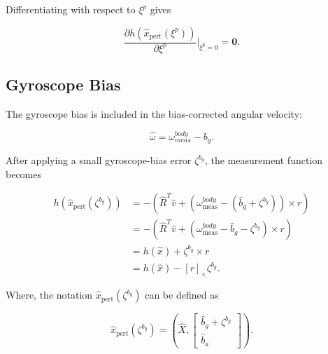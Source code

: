 \documentclass[report.tex]{subfiles}
\begin{document}
    Differentiating with respect to $\xi^p$ gives

    \begin{equation}
        \frac{\partial h(\hat x_{\mathrm{pert}}(\xi^p))}
        {\partial \xi^p}\bigg|_{\xi^p=0}
        =
        \mathbf{0}.
    \end{equation}

    \subsection{Gyroscope Bias}

    The gyroscope bias is included in the bias-corrected angular velocity:

    \begin{equation}
        \hat \omega
        =
        \omega_{meas}^{body}-b_g.
    \end{equation}

    After applying a small gyroscope-bias error $\zeta^{b_g}$, the measurement function becomes

\begin{align}
    h\left(\hat x_{\mathrm{pert}}(\zeta^{b_g})\right)
    &=
    -\left(
        \hat{R}^{T}\hat{v}
        +
        \left(
            \omega_{\mathrm{meas}}^{body}
            -
            \left(
                \hat{b}_g+\zeta^{b_g}
            \right)
        \right)
        \times r
    \right)
    \\
    &=
    -\left(
        \hat{R}^{T}\hat{v}
        +
        \left(
            \omega_{\mathrm{meas}}^{body}
            -
            \hat{b}_g
            -
            \zeta^{b_g}
        \right)
        \times r
    \right)
    \\
    &=
    h(\hat{x})
    +
    \zeta^{b_g}\times r
    \\
    &=
    h(\hat{x})
    -
    [r]_{\times}\zeta^{b_g}.
\end{align}

    Where, the notation $\hat x_{\mathrm{pert}}(\zeta^{b_g})$ can be defined as 
    
\begin{equation}
    \hat x_{\mathrm{pert}}(\zeta^{b_g})
    =
    \left(
        \hat{X},
        \begin{bmatrix}
            \hat{b}_g+\zeta^{b_g} \\
            \hat{b}_a
        \end{bmatrix}
    \right).
    \label{eq:gyroBiasPerturbedState}
\end{equation}
\end{document}
